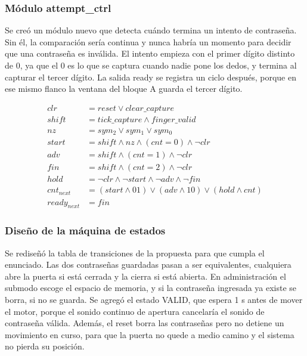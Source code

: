 \documentclass[11pt,letterpaper]{article}
\begin{document}
\subsubsection*{Módulo attempt\_ctrl}
 
Se creó un módulo nuevo que detecta cuándo termina un intento de contraseña. Sin él, la comparación sería continua y nunca habría un momento para decidir que una contraseña es inválida. El intento empieza con el primer dígito distinto de 0, ya que el 0 es lo que se captura cuando nadie pone los dedos, y termina al capturar el tercer dígito. La salida ready se registra un ciclo después, porque en ese mismo flanco la ventana del bloque A guarda el tercer dígito.
 
\begin{align*}
clr &= reset \lor clear\_capture \\
shift &= tick\_capture \land finger\_valid \\
nz &= sym_2 \lor sym_1 \lor sym_0 \\
start &= shift \land nz \land (cnt = 0) \land \lnot clr \\
adv &= shift \land (cnt = 1) \land \lnot clr \\
fin &= shift \land (cnt = 2) \land \lnot clr \\
hold &= \lnot clr \land \lnot start \land \lnot adv \land \lnot fin \\
cnt_{next} &= (start \land 01) \lor (adv \land 10) \lor (hold \land cnt) \\
ready_{next} &= fin
\end{align*}
 
\subsubsection*{Diseño de la máquina de estados}
 
Se rediseñó la tabla de transiciones de la propuesta para que cumpla el enunciado. Las dos contraseñas guardadas pasan a ser equivalentes, cualquiera abre la puerta si está cerrada y la cierra si está abierta. En administración el submodo escoge el espacio de memoria, y si la contraseña ingresada ya existe se borra, si no se guarda. Se agregó el estado VALID, que espera 1 s antes de mover el motor, porque el sonido continuo de apertura cancelaría el sonido de contraseña válida. Además, el reset borra las contraseñas pero no detiene un movimiento en curso, para que la puerta no quede a medio camino y el sistema no pierda su posición.
 
\end{document}
